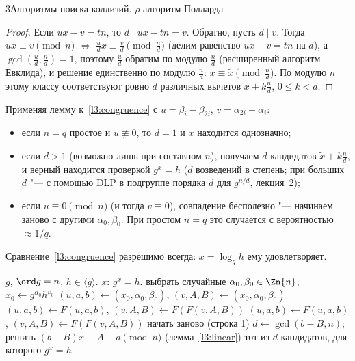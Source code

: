 \begin{lecture}{3}{Алгоритмы поиска коллизий. \texorpdfstring{$\rho$}{ρ}-алгоритм Полларда}
\begin{proof}
Если $ux - v = tn$, то $d \mid ux - tn = v$. Обратно, пусть $d \mid v$. Тогда
$ux \equiv v \pmod n$ $\iff$ $\frac ud x \equiv \frac vd \pmod{\frac nd}$ (делим равенство
$ux - v = tn$ на $d$), а $\gcd(\frac ud, \frac nd) = 1$, поэтому $\frac ud$ обратим по модулю
$\frac nd$ (расширенный алгоритм Евклида), и решение единственно по модулю $\frac nd$:
$x \equiv \tilde x \pmod{\frac nd}$. По модулю $n$ этому классу соответствуют ровно
$d$ различных вычетов $\tilde x + k \frac nd$, $0 \le k < d$.
\end{proof}

Применяя лемму к~\eqref{l3:congruence} с $u = \beta_i - \beta_{2i}$, $v = \alpha_{2i} - \alpha_i$:
\begin{itemize}
  \item если $n = q$ простое и $u \not\equiv 0$, то $d = 1$ и $x$ находится однозначно;
  \item если $d > 1$ (возможно лишь при составном $n$), получаем $d$ кандидатов
    $\tilde x + k\frac nd$, и верный находится проверкой $g^{x} = h$ ($d$ возведений
    в степень; при больших $d$ "--- с помощью DLP в подгруппе порядка $d$ для
    $g^{n/d}$, лекция~2);
  \item если $u \equiv 0 \pmod n$ (и тогда $v \equiv 0$), совпадение бесполезно "--- начинаем
    заново с другими $\alpha_0, \beta_0$. При простом $n = q$ это случается с вероятностью
    $\approx 1/q$.
\end{itemize}
Сравнение~\eqref{l3:congruence} разрешимо всегда: $x = \log_g h$ ему удовлетворяет.

\begin{algorithm}
\begin{algorithmic}[1]
\Require $g$, $\ord g = n$, $h \in \langle g \rangle$.
\Ensure $x$: $g^x = h$.
\State выбрать случайные $\alpha_0, \beta_0 \in \Zn{n}$, $x_0 \gets g^{\alpha_0}h^{\beta_0}$
\State $(u, a, b) \gets (x_0, \alpha_0, \beta_0)$, \quad $(v, A, B) \gets (x_0, \alpha_0, \beta_0)$
\State $(u, a, b) \gets F(u, a, b)$, \quad $(v, A, B) \gets F(F(v, A, B))$
  \State $(u, a, b) \gets F(u, a, b)$, \quad $(v, A, B) \gets F(F(v, A, B))$
\EndWhile
{} \State начать заново (строка 1) \EndIf
\State $d \gets \gcd(b - B, n)$; решить $(b - B)x \equiv A - a \pmod n$ (лемма~\ref{l3:linear})
\State \Return тот из $d$ кандидатов, для которого $g^x = h$
\end{algorithmic}
\end{algorithm}


\end{lecture}
